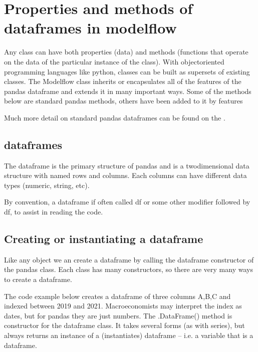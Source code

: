 \documentclass[letterpaper,10pt,english]{jupyterBook}
\begin{document}
\section{Properties and methods of dataframes in modelflow}
\label{\detokenize{content/04_PythonEssentials/PythonPackagesEtc:properties-and-methods-of-dataframes-in-modelflow}}
\sphinxAtStartPar
Any class can have both properties (data) and methods (functions that operate on the data of the particular instance of the class). With object\sphinxhyphen{}oriented programming languages like python, classes can be built as supersets of existing classes. The Modelflow class  inherits or encapsulates all of the features of the pandas dataframe and extends it in many important ways.  Some of the methods below are standard pandas methods, others have been added to it by  features

\sphinxAtStartPar
Much more detail on standard pandas dataframes can be found on the .


\subsection{dataframes}
\label{\detokenize{content/04_PythonEssentials/PythonPackagesEtc:dataframes}}
\sphinxAtStartPar
The dataframe is the primary structure of pandas and is a two\sphinxhyphen{}dimensional data structure with named rows and columns.  Each columns can have different data types (numeric, string, etc).

\sphinxAtStartPar
By convention, a dataframe if often called df or some other modifier followed by df, to assist in reading the code.


\subsection{Creating or instantiating a dataframe}
\label{\detokenize{content/04_PythonEssentials/PythonPackagesEtc:creating-or-instantiating-a-dataframe}}
\sphinxAtStartPar
Like any object we an create a dataframe by calling the dataframe constructor of the pandas class.  Each class has many constructors, so there are very many ways to create a dataframe.

\sphinxAtStartPar
The code example below creates a dataframe of three columns A,B,C and  indexed between 2019 and 2021.  Macroeconomists may interpret the index as dates, but for pandas they are just numbers.  The .DataFrame() method is constructor for the dataframe class. It takes several forms (as with series), but always returns an instance of a (instantiates) dataframe – i.e. a variable that is a dataframe.
\end{document}
